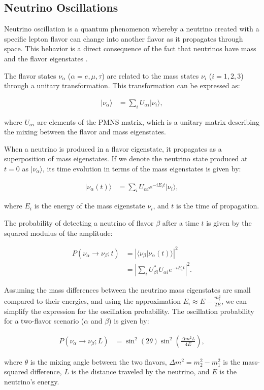 \subsection{Neutrino Oscillations}

Neutrino oscillation is a quantum phenomenon whereby a neutrino created with a specific lepton flavor can change into another flavor as it propagates through space.
This behavior is a direct consequence of the fact that neutrinos have mass and the flavor eigenstates .


The flavor states \(\nu_\alpha\) (\(\alpha = e, \mu, \tau\)) are related to the mass states \(\nu_i\) (\(i = 1, 2, 3\)) through a unitary transformation.
This transformation can be expressed as:

\begin{align}
|\nu_\alpha\rangle &= \sum_{i} U_{\alpha i} |\nu_i\rangle,
\end{align}

where \(U_{\alpha i}\) are elements of the PMNS matrix, which is a unitary matrix describing the mixing between the flavor and mass eigenstates.

When a neutrino is produced in a flavor eigenstate, it propagates as a superposition of mass eigenstates.
If we denote the neutrino state produced at \(t = 0\) as \(|\nu_\alpha\rangle\), its time evolution in terms of the mass eigenstates is given by:

\begin{align}
|\nu_\alpha(t)\rangle &= \sum_{i} U_{\alpha i} e^{-i E_i t} |\nu_i\rangle,
\end{align}

where \(E_i\) is the energy of the mass eigenstate \(\nu_i\), and \(t\) is the time of propagation.

The probability of detecting a neutrino of flavor \(\beta\) after a time \(t\) is given by the squared modulus of the amplitude:

\begin{align}
P(\nu_\alpha \to \nu_\beta; t) &= \left| \langle \nu_\beta | \nu_\alpha(t) \rangle \right|^2 \\
&= \left| \sum_{i} U_{\beta i}^* U_{\alpha i} e^{-i E_i t} \right|^2.
\end{align}

Assuming the mass differences between the neutrino mass eigenstates are small compared to their energies, and using the approximation \(E_i \approx E - \frac{m_i^2}{2E}\), we can simplify the expression for the oscillation probability.
The oscillation probability for a two-flavor scenario (\(\alpha\) and \(\beta\)) is given by:

\begin{align}
P(\nu_\alpha \to \nu_\beta; L) &= \sin^2(2\theta) \sin^2\left(\frac{\Delta m^2 L}{4 E}\right),
\end{align}

where \(\theta\) is the mixing angle between the two flavors, \(\Delta m^2 = m_2^2 - m_1^2\) is the mass-squared difference, \(L\) is the distance traveled by the neutrino, and \(E\) is the neutrino's energy.



